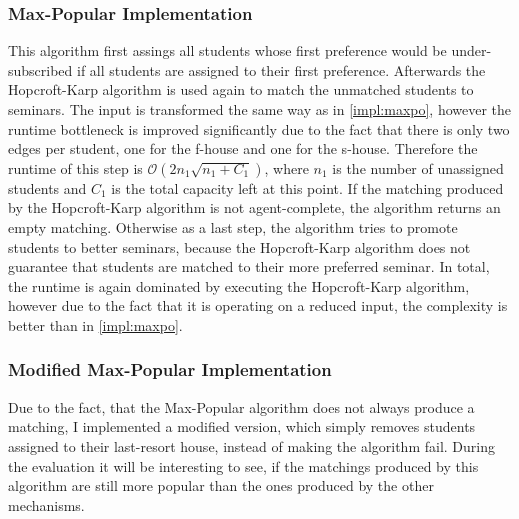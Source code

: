 \subsubsection{Max-Popular Implementation}
This algorithm first assings all students whose first preference would be under-subscribed if all students are assigned to their first preference. Afterwards the Hopcroft-Karp algorithm is used again to match the unmatched students to seminars. The input is transformed the same way as in \ref{impl:maxpo}, however the runtime bottleneck is improved significantly due to the fact that there is only two edges per student, one for the f-house and one for the s-house. Therefore the runtime of this step is $\mathcal{O}(2n_1\sqrt{n_1+C_1})$, where $n_1$ is the number of unassigned students and $C_1$ is the total capacity left at this point. If the matching produced by the Hopcroft-Karp algorithm is not agent-complete, the algorithm returns an empty matching. Otherwise as a last step, the algorithm tries to promote students to better seminars, because the Hopcroft-Karp algorithm does not guarantee that students are matched to their more preferred seminar. In total, the runtime is again dominated by executing the Hopcroft-Karp algorithm, however due to the fact that it is operating on a reduced input, the complexity is better than in \ref{impl:maxpo}.

\subsubsection{Modified Max-Popular Implementation}
Due to the fact, that the Max-Popular algorithm does not always produce a matching, I implemented a modified version, which simply removes students assigned to their last-resort house, instead of making the algorithm fail. During the evaluation it will be interesting to see, if the matchings produced by this algorithm are still more popular than the ones produced by the other mechanisms.

